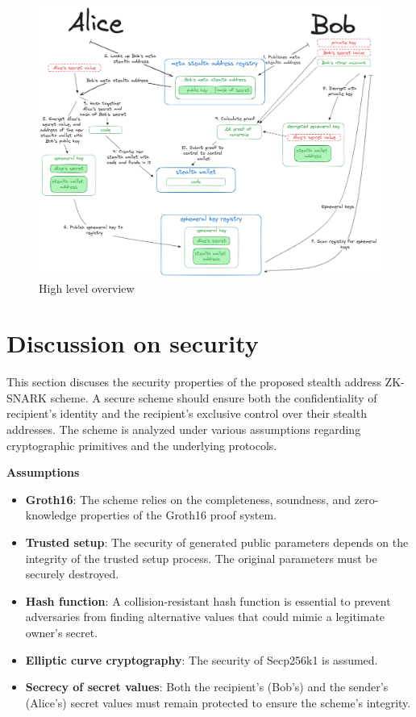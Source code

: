\documentclass[conference,comsoc,10pt]{IEEEtran}
\begin{document}
    \begin{figure}[h]
        \centering
        \includegraphics[scale=0.11]{../bachelor/assets/images/high-level-flow.png}
        \caption{High level overview}
        \label{fig:high-level-flow}
    \end{figure}

\section{Discussion on security}

    This section discuses the security properties of the proposed stealth address
    ZK-SNARK scheme. A secure scheme should ensure both the confidentiality
    of recipient's identity and the recipient's exclusive control over their
    stealth addresses. The scheme is analyzed under various assumptions
    regarding cryptographic primitives and the underlying protocols.

    \textbf{Assumptions}
    \begin{itemize}
        \item \textbf{Groth16}: The scheme relies on the completeness, soundness,
            and zero-knowledge properties of the Groth16 proof system.
        \item \textbf{Trusted setup}: The security of generated public parameters
            depends on the integrity of the trusted setup process. The original
            parameters must be securely destroyed.
        \item \textbf{Hash function}: A collision-resistant hash function is
            essential to prevent adversaries from finding alternative values
            that could mimic a legitimate owner's secret.
        \item \textbf{Elliptic curve cryptography}: The security of Secp256k1 is
            assumed.
        \item \textbf{Secrecy of secret values}: Both the recipient's (Bob's)
            and the sender's (Alice's) secret values must remain protected
            to ensure the scheme's integrity.
    \end{itemize}
\end{document}
